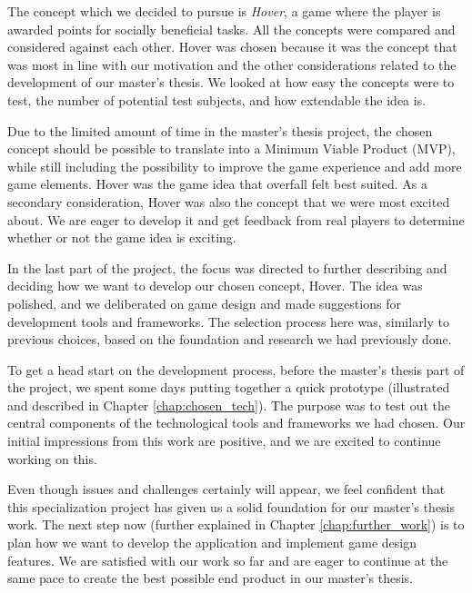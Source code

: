 \documentclass[../Main.tex]{subfiles}
\begin{document}
The concept which we decided to pursue is \textit{Hover}, a game where the player is awarded points for socially beneficial tasks. All the concepts were compared and considered against each other. Hover was chosen because it was the concept that was most in line with our motivation and the other considerations related to the development of our master’s thesis. We looked at how easy the concepts were to test, the number of potential test subjects, and how extendable the idea is. 

Due to the limited amount of time in the master’s thesis project, the chosen concept should be possible to translate into a Minimum Viable Product (MVP), while still including the possibility to improve the game experience and add more game elements. Hover was the game idea that overfall felt best suited. As a secondary consideration, Hover was also the concept that we were most excited about. We are eager to develop it and get feedback from real players to determine whether or not the game idea is exciting.

In the last part of the project, the focus was directed to further describing and deciding how we want to develop our chosen concept, Hover. The idea was polished, and we deliberated on game design and made suggestions for development tools and frameworks. The selection process here was, similarly to previous choices, based on the foundation and research we had previously done. 

To get a head start on the development process, before the master’s thesis part of the project, we spent some days putting together a quick prototype (illustrated and described in Chapter \ref{chap:chosen_tech}). The purpose was to test out the central components of the technological tools and frameworks we had chosen. Our initial impressions from this work are positive, and we are excited to continue working on this.

Even though issues and challenges certainly will appear, we feel confident that this specialization project has given us a solid foundation for our master’s thesis work. The next step now (further explained in Chapter \ref{chap:further_work}) is to plan how we want to develop the application and implement game design features. We are satisfied with our work so far and are eager to continue at the same pace to create the best possible end product in our master’s thesis.


\biblio %
\end{document}
